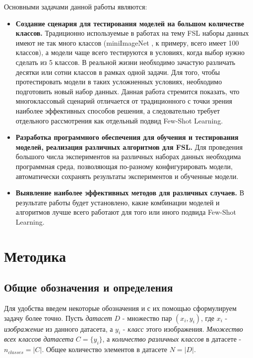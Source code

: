 \documentclass[a4paper, 12pt]{report}
\begin{document}
Основными задачами данной работы являются:
\begin{itemize}

\item \textbf {Создание сценария для тестирования моделей на большом количестве классов.} Традиционно используемые в работах на тему FSL наборы данных имеют не так много классов (miniImageNet \cite{imagenet}, к примеру, всего имеет 100 классов), а модели чаще всего тестируются в условиях, когда выбор нужно сделать из 5 классов. В реальной жизни необходимо зачастую различать десятки или сотни классов в рамках одной задачи. Для того, чтобы протестировать модели в таких усложненных условиях, необходимо подготовить новый набор данных. Данная работа стремится показать, что многоклассовый сценарий отличается от традиционного с точки зрения наиболее эффективных способов решения, а следовательно требует отдельного рассмотрения как отдельный подвид Few-Shot Learning.

\item \textbf {Разработка программного обеспечения для обучения и тестирования моделей, реализация различных алгоритмов для FSL.} Для проведения большого числа экспериментов на различных наборах данных необходима  программная среда, позволяющая по-разному конфигурировать модели, автоматически сохранять результаты экспериментов и обученные модели.

\item \textbf {Выявление наиболее эффективных методов для различных случаев.} В результате работы будет установлено, какие комбинации моделей и алгоритмов лучше всего работают для того или иного подвида Few-Shot Learning.

\end{itemize}

\chapter{Методика}

\section {Общие обозначения и определения}

Для удобства введем некоторые обозначения и с их помощью сформулируем задачу более точно. Пусть \textit{датасет} $D$ - множество пар $(x_i, y_i)$, где $x_i$ - \textit{изображение} из данного датасета, а $y_i$ - \textit{класс} этого изображения. \textit{Множество всех классов датасета} $C = \{y_i\}$, а \textit{количество различных классов} в датасете - $n_{classes} = |C|$. Общее количество элементов в датасете $N = |D|$. \\
\end{document}
